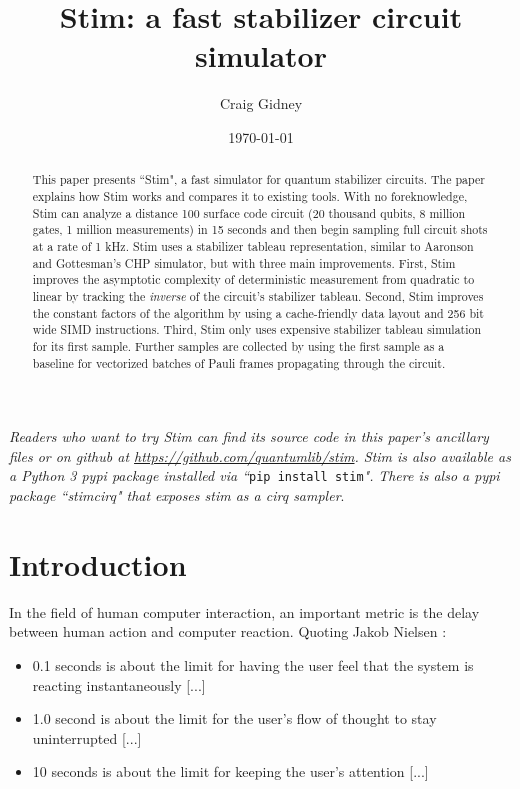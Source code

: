 \documentclass[onecolumn,unpublished]{quantumarticle}
\theoremstyle{definition}
\theoremstyle{definition}
\theoremstyle{definition}
\begin{document}
\title{Stim: a fast stabilizer circuit simulator}

\date{\today}
\author{Craig Gidney}

\begin{abstract}
This paper presents ``Stim", a fast simulator for quantum stabilizer circuits.
The paper explains how Stim works and compares it to existing tools.
With no foreknowledge, Stim can analyze a distance 100 surface code circuit (20 thousand qubits, 8 million gates, 1 million measurements) in 15 seconds and then begin sampling full circuit shots at a rate of 1 kHz.
Stim uses a stabilizer tableau representation, similar to Aaronson and Gottesman's CHP simulator, but with three main improvements.
First, Stim improves the asymptotic complexity of deterministic measurement from quadratic to linear by tracking the {\em inverse} of the circuit's stabilizer tableau.
Second, Stim improves the constant factors of the algorithm by using a cache-friendly data layout and 256 bit wide SIMD instructions.
Third, Stim only uses expensive stabilizer tableau simulation for its first sample.
Further samples are collected by using the first sample as a baseline for vectorized batches of Pauli frames propagating through the circuit.
\end{abstract}

\maketitle

\emph{
Readers who want to try Stim can find its source code in this paper's ancillary files or on github at \url{https://github.com/quantumlib/stim}.
Stim is also available as a Python 3 pypi package installed via ``}\texttt{pip install stim}\emph{".}
\emph{There is also a pypi package ``stimcirq" that exposes stim as a cirq sampler}.

\section{Introduction}
\label{sec:introduction}

In the field of human computer interaction, an important metric is the delay between human action and computer reaction.
Quoting Jakob Nielsen \cite{nielsen1994usability,nielsenusabilitysite1993}:

\begin{itemize}
    \item 0.1 seconds is about the limit for having the user feel that the system is reacting instantaneously [...]
    \item 1.0 second is about the limit for the user's flow of thought to stay uninterrupted [...]
    \item 10 seconds is about the limit for keeping the user's attention [...]
\end{itemize}
\end{document}
